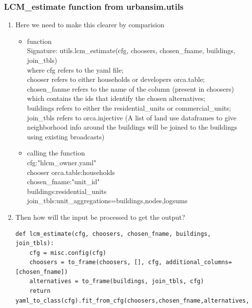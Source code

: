 \documentclass{article}\usepackage[]{graphicx}\usepackage[]{color}
\begin{document}
\subsubsection{LCM\_estimate function from urbansim.utils}
\begin{enumerate}

\item{Here we need to make this clearer by comparision}\\

\begin{itemize}
\item{function}\\
Signature: utils.lcm\_estimate(cfg, choosers, chosen\_fname, buildings, join\_tbls)\\
where cfg refers to the yaml file;\\
chooser refers to either households or developers orca.table;\\
chosen\_fanme refers to the name of the column (present in choosers) which contains the ids that identify the chosen alternatives;\\
buildings refers to either the residential\_units or commercial\_units;\\
join\_tbls refers to orca.injective (A list of land use dataframes to give neighborhood info around the buildings will be joined to the buildings using existing broadcasts)\\
\item{calling the function}\\
cfg:"hlcm\_owner.yaml"\\
chooser orca.table:households\\
chosen\_fname:"unit\_id"\\
buildings:residential\_units\\
join\_tbls:unit\_aggregations=buildings,nodes,logsums\\
\end{itemize}


\item{Then how will the input be processed to get the output?}
\begin{lstlisting}
def lcm_estimate(cfg, choosers, chosen_fname, buildings, join_tbls):
    cfg = misc.config(cfg)
    choosers = to_frame(choosers, [], cfg, additional_columns=[chosen_fname])
    alternatives = to_frame(buildings, join_tbls, cfg)
    return yaml_to_class(cfg).fit_from_cfg(choosers,chosen_fname,alternatives,cfg)
\end{lstlisting}

\end{enumerate}
\end{document}
